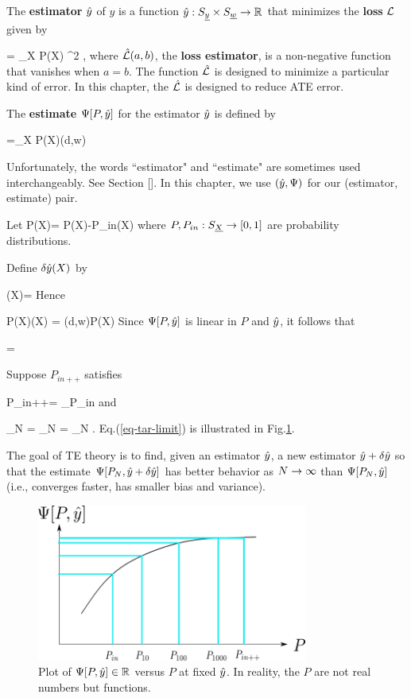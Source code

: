 The {\bf estimator} ${\hat{y}}$ of $y$
is a function ${\hat{y}}:S_{\underline{y}}\times S_{\underline{w}}\rightarrow { \mathbb{R}}$
that minimizes the {\bf loss} ${\cal L}$
given by


\beq
\call[P, \haty]= \sum_X P(X) \hatl[y, \haty(x,w)]^2
\;,
\eeq
where $\hat{{\cal L}}(a,b)$, the {\bf loss
estimator}, is a
non-negative function
that vanishes when $a=b$.
The function $\hat{{\cal L}}$ is designed
to minimize a particular kind of error.
In this chapter, the $\hat{{\cal L}}$
is designed to reduce ATE error.




The {\bf estimate}
 $\Psi[P, {\hat{y}}]$ for the estimator ${\hat{y}}$
is defined by

\beq
\Psi[P, \haty] =\sum_X P(X)\haty(d,w)
\eeq

Unfortunately, the words ``estimator"
and ``estimate" are sometimes used
interchangeably. See Section
[].
In this chapter, we use $({\hat{y}}, \Psi)$
for our (estimator, estimate) pair.


Let
\beq
\delta P(X)=
P(X)-P_{in}(X)
\eeq
where $P, P_{in}:S_{\underline{X}}\rightarrow [0,1]$ are
probability distributions.

Define $\delta{\hat{y}}(X)$ by

\beq
\delta\haty(X)= 
\eeq
Hence

\beq
P(X)\delta\haty(X) = \haty(d,w)\delta P(X)
\eeq
Since $\Psi[P, {\hat{y}}]$
is linear in $P$ and ${\hat{y}}$,
it follows that

\beq
{}=
\eeq


Suppose $P_{in++}$ satisfies


\beq
P_{in++}= \argmin_{P_{in}}\call[P_{in}, \haty]
\eeq
and

\beq
\lim_{N\rarrow \infty}
=
\lim_{N\rarrow \infty}
=
\lim_{N\rarrow \infty}
\Psi[P_N, \haty]
\label{eq-tar-limit}
\;.
\eeq
Eq.(\ref{eq-tar-limit}) is illustrated in
Fig.\ref{fig-targeted-p-psi-plot.png}.

The goal of TE theory
is to find, given an estimator ${\hat{y}}$,
a new estimator ${\hat{y}} +\delta {\hat{y}}$
so that the
estimate $\Psi[P_N, {\hat{y}}+\delta {\hat{y}}]$
has better behavior as $N\rightarrow \infty$ than
$\Psi[P_N, {\hat{y}}]$ (i.e., converges faster,
has smaller bias and variance).


\begin{figure}[h!]
\centering
\includegraphics[width=3.5in]
{targeted-est/targeted-p-psi-plot.png}
\caption{
Plot of $\Psi[P, {\hat{y}}]\in { \mathbb{R}}$ versus $P$
at fixed ${\hat{y}}$.
In reality, the $P$ are not real numbers but
functions.
}
\label{fig-targeted-p-psi-plot.png}
\end{figure}


